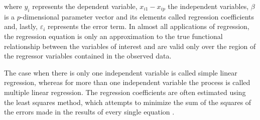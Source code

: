 where $ y_{i} $ represents the dependent variable, $ x_{i1} - x_{ip} $ the independent variables, $ \beta $ is a $ p $-dimensional parameter vector and its elements called regression coefficients and, lastly, $ \varepsilon_{i} $ represents the error term. In almost all applications of regression, the regression equation is only an approximation to the true functional relationship between the variables of interest and are valid only over the region of the regressor variables contained in the observed data.

The case when there is only one independent variable is called simple linear regression, whereas for more than one independent variable the process is called multiple linear regression. The regression coefficients are often estimated using the least squares method, which attempts to minimize the sum of the squares of the errors made in the results of every single equation \citep{darlington2016regression}.





